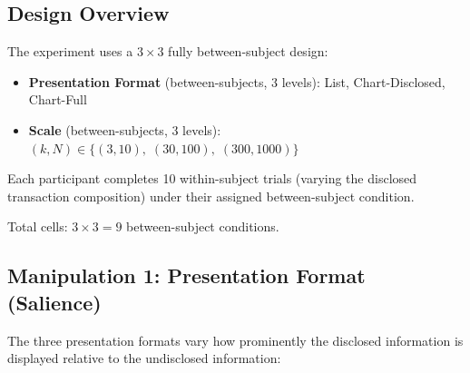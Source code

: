 \documentclass[12pt]{article}
\theoremstyle{definition}
\begin{document}
\subsection{Design Overview}

The experiment uses a $3 \times 3$ fully between-subject design:

\begin{itemize}[nosep]
\item \textbf{Presentation Format} (between-subjects, 3 levels): List, Chart-Disclosed, Chart-Full
\item \textbf{Scale} (between-subjects, 3 levels): $(k, N) \in \{(3, 10),\; (30, 100),\; (300, 1000)\}$
\end{itemize}

Each participant completes 10 within-subject trials (varying the disclosed transaction composition) under their assigned between-subject condition.

Total cells: $3 \times 3 = 9$ between-subject conditions.

\subsection{Manipulation 1: Presentation Format (Salience)}
\label{sec:format}

The three presentation formats vary how prominently the disclosed information is displayed relative to the undisclosed information:
\end{document}
